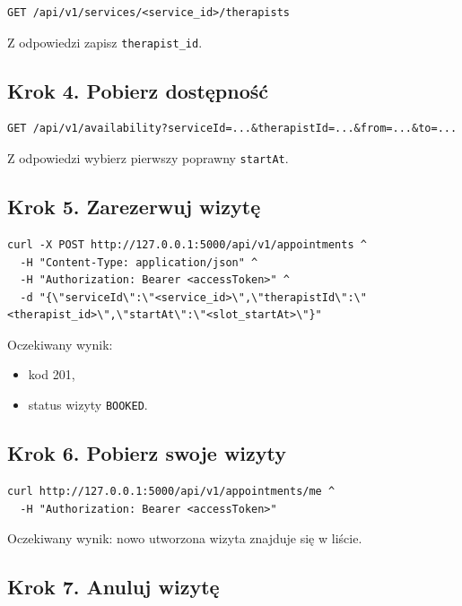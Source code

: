 \documentclass[11pt,a4paper]{article}
\begin{document}
\begin{lstlisting}
GET /api/v1/services/<service_id>/therapists
\end{lstlisting}

Z odpowiedzi zapisz \texttt{therapist\_id}.

\subsection{Krok 4. Pobierz dostępność}

\begin{lstlisting}
GET /api/v1/availability?serviceId=...&therapistId=...&from=...&to=...
\end{lstlisting}

Z odpowiedzi wybierz pierwszy poprawny \texttt{startAt}.

\subsection{Krok 5. Zarezerwuj wizytę}

\begin{lstlisting}
curl -X POST http://127.0.0.1:5000/api/v1/appointments ^
  -H "Content-Type: application/json" ^
  -H "Authorization: Bearer <accessToken>" ^
  -d "{\"serviceId\":\"<service_id>\",\"therapistId\":\"<therapist_id>\",\"startAt\":\"<slot_startAt>\"}"
\end{lstlisting}

Oczekiwany wynik:
\begin{itemize}[leftmargin=1.2cm]
    \item kod 201,
    \item status wizyty \texttt{BOOKED}.
\end{itemize}

\subsection{Krok 6. Pobierz swoje wizyty}

\begin{lstlisting}
curl http://127.0.0.1:5000/api/v1/appointments/me ^
  -H "Authorization: Bearer <accessToken>"
\end{lstlisting}

Oczekiwany wynik: nowo utworzona wizyta znajduje się w liście.

\subsection{Krok 7. Anuluj wizytę}
\end{document}
